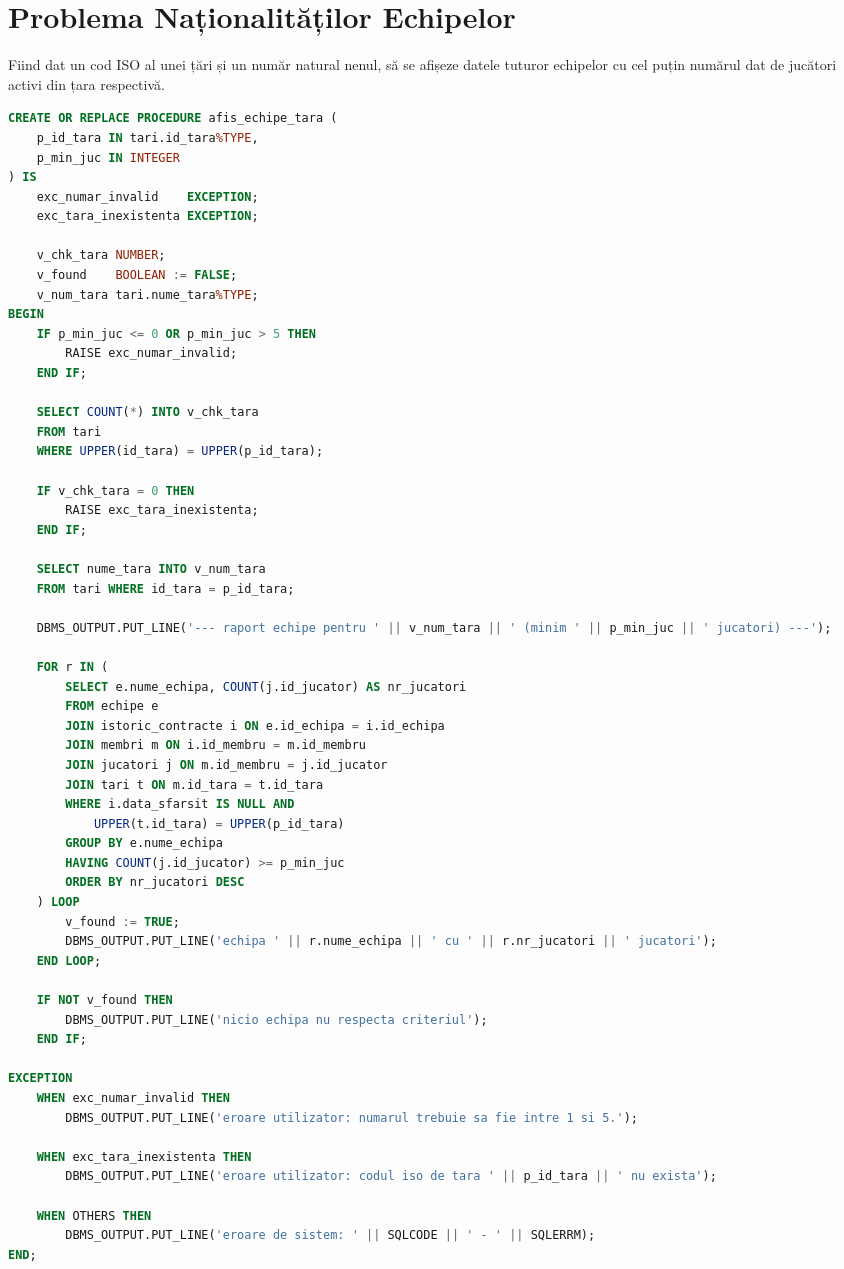 \documentclass[11pt, a4paper]{article}
\begin{document}
\newpage
\section{Problema Naționalităților Echipelor}
Fiind dat un cod ISO al unei țări și un număr natural nenul, să se afișeze datele tuturor echipelor cu cel puțin numărul dat de jucători activi din țara respectivă.
\begin{multicols}{2}
\begin{lstlisting}[language=SQL, numbers=none]
CREATE OR REPLACE PROCEDURE afis_echipe_tara (
    p_id_tara IN tari.id_tara%TYPE,
    p_min_juc IN INTEGER
) IS
    exc_numar_invalid    EXCEPTION;
    exc_tara_inexistenta EXCEPTION;
    
    v_chk_tara NUMBER;
    v_found    BOOLEAN := FALSE;
    v_num_tara tari.nume_tara%TYPE;
BEGIN
    IF p_min_juc <= 0 OR p_min_juc > 5 THEN
        RAISE exc_numar_invalid;
    END IF;

    SELECT COUNT(*) INTO v_chk_tara
    FROM tari
    WHERE UPPER(id_tara) = UPPER(p_id_tara);

    IF v_chk_tara = 0 THEN
        RAISE exc_tara_inexistenta;
    END IF;

    SELECT nume_tara INTO v_num_tara
    FROM tari WHERE id_tara = p_id_tara;

    DBMS_OUTPUT.PUT_LINE('--- raport echipe pentru ' || v_num_tara || ' (minim ' || p_min_juc || ' jucatori) ---');

    FOR r IN (
        SELECT e.nume_echipa, COUNT(j.id_jucator) AS nr_jucatori
        FROM echipe e
        JOIN istoric_contracte i ON e.id_echipa = i.id_echipa
        JOIN membri m ON i.id_membru = m.id_membru
        JOIN jucatori j ON m.id_membru = j.id_jucator
        JOIN tari t ON m.id_tara = t.id_tara
        WHERE i.data_sfarsit IS NULL AND
            UPPER(t.id_tara) = UPPER(p_id_tara)
        GROUP BY e.nume_echipa
        HAVING COUNT(j.id_jucator) >= p_min_juc
        ORDER BY nr_jucatori DESC
    ) LOOP
        v_found := TRUE;
        DBMS_OUTPUT.PUT_LINE('echipa ' || r.nume_echipa || ' cu ' || r.nr_jucatori || ' jucatori');
    END LOOP;

    IF NOT v_found THEN
        DBMS_OUTPUT.PUT_LINE('nicio echipa nu respecta criteriul');
    END IF;

EXCEPTION
    WHEN exc_numar_invalid THEN
        DBMS_OUTPUT.PUT_LINE('eroare utilizator: numarul trebuie sa fie intre 1 si 5.');

    WHEN exc_tara_inexistenta THEN
        DBMS_OUTPUT.PUT_LINE('eroare utilizator: codul iso de tara ' || p_id_tara || ' nu exista');

    WHEN OTHERS THEN
        DBMS_OUTPUT.PUT_LINE('eroare de sistem: ' || SQLCODE || ' - ' || SQLERRM);
END;
\end{lstlisting}
\end{multicols}
\end{document}
